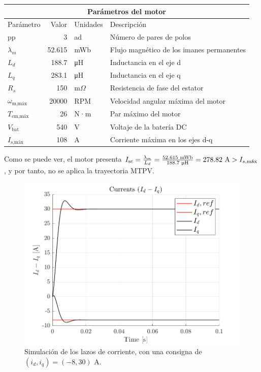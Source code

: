 \begin{tabular}{|p{2cm}||r|p{1.5cm}|p{8cm}|}
	\hline
	\multicolumn{4}{|c|}{Parámetros del motor} \\
	\hline
	Parámetro & Valor & Unidades & Descripción \\
	\hline
	pp & 3 & ad & Número de pares de polos \\
	$\lambda_m$ & 52.615 & mWb & Flujo magnético de los imanes permanentes \\
	$L_d$ & 188.7 & \unit{\micro\henry} & Inductancia en el eje d \\
	$L_q$ & 283.1 & \unit{\micro\henry} & Inductancia en el eje q \\
	$R_s$ & 150 & m$\Omega$ & Resistencia de fase del estator \\
	$\omega_{\text{m,máx}}$ & 20000 & RPM & Velocidad angular máxima del motor \\
	$T_{\text{em,máx}}$ & 26 & N·m & Par máximo del motor \\
	$V_{\text{bat}}$ & 540 & V & Voltaje de la batería DC \\
	$I_{\text{s,máx}}$ & 108 & A & Corriente máxima en los ejes d-q \\
	\hline
\end{tabular}

Como se puede ver, el motor presenta $I_{\text{sc}} = \frac{\lambda_m}{L_d} =  \frac{52.615 \text{ mWb}}{188.7 \text{ }\text{\unit{\micro\henry}}} = 278.82 \text{ A} > I_{s,\text{máx}}$, y por tanto, no se aplica la trayectoria MTPV.

\begin{figure}[H]
    \centering
    \includegraphics[width=0.75\linewidth]{fig/idiq_plot_PI.png}
    \caption{Simulación de los lazos de corriente, con una consigna de $(i_d, i_q) = (-8, 30) \text{ A}$.}
\end{figure}


